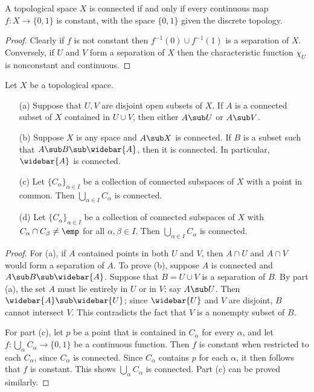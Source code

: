 \begin{proposition}\label{topo space connected iff continuous map to {0,1}}
A topological space $X$ is connected if and only if every continuous map $f:X\to\{0,1\}$ is constant, with the space $\{0,1\}$ given the discrete topology.
\end{proposition}
\begin{proof}
Clearly if $f$ is not constant then $f^{-1}(0)\cup f^{-1}(1)$ is a separation of $X$. Conversely, if $U$ and $V$ form a separation of $X$ then the characteristic function $\chi_U$ is nonconstant and continuous.
\end{proof}
\begin{proposition}\label{topo space connected prop}
Let $X$ be a topological space.
\begin{itemize}
\item[(a)] Suppose that $U,V$ are disjoint open subsets of $X$. If $A$ is a connected subset of $X$ contained in $U\cup V$, then either $A\sub U$ or $A\sub V$.
\item[(b)] Suppose $X$ is any space and $A\sub X$ is connected. If $B$ is a subset such that $A\sub B\sub\widebar{A}$, then it is connected. In particular, $\widebar{A}$ is connected.
\item[(c)] Let $\{C_{\alpha}\}_{\alpha\in I}$ be a collection of connected subspaces of $X$ with a point in common. Then $\bigcup_{\alpha\in I}C_\alpha$ is connected.
\item[(d)] Let $\{C_{\alpha}\}_{\alpha\in I}$ be a collection of connected subspaces of $X$ with $C_\alpha\cap C_\beta\neq\emp$ for all $\alpha,\beta\in I$. Then $\bigcup_{\alpha\in I}C_\alpha$ is connected. 
\end{itemize}
\end{proposition}
\begin{proof}
For (a), if $A$ contained points in both $U$ and $V$, then $A\cap U$ and $A\cap V$ would form a separation of $A$. To prove (b), suppose $A$ is connected and $A\sub B\sub\widebar{A}$. Suppose that $B=U\cup V$ is a separation of $B$. By part (a), the set $A$ must lie entirely in $U$ or in $V$; say $A\sub U$. Then $\widebar{A}\sub\widebar{U}$; since $\widebar{U}$ and $V$ are disjoint, $B$ cannot intersect $V$. This contradicts the fact that $V$ is a nonempty subset of $B$.\par
For part (c), let $p$ be a point that is contained in $C_\alpha$ for every $\alpha$, and let $f:\bigcup_\alpha C_\alpha\to\{0,1\}$ be a continuous function. Then $f$ is constant when restricted to each $C_\alpha$, since $C_\alpha$ is connected. Since $C_\alpha$ contains $p$ for each $\alpha$, it then follows that $f$ is constant. This shows $\bigcup_{\alpha}C_\alpha$ is connected. Part (c) can be proved similarly.
\end{proof}
